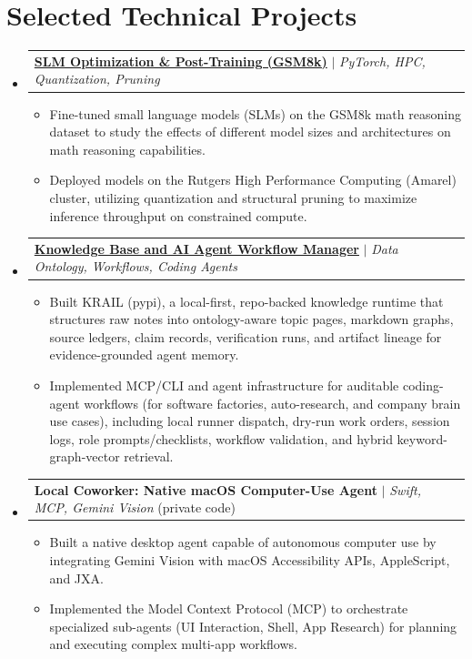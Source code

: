 \documentclass[letterpaper,11pt]{article}
\makeatletter
\newcommand{\resumeItem}[1]{
  \item\small{
    {#1 \vspace{-2pt}}
  }
}
\newcommand{\resumeProjectHeading}[2]{
    \item
    \begin{tabular*}{0.97\textwidth}{l@{\extracolsep{\fill}}r}
      \small#1 & #2 \\
    \end{tabular*}\vspace{-7pt}
}
\newcommand{\resumeSubHeadingListStart}{\begin{itemize}[leftmargin=0.15in, label={}]}
\newcommand{\resumeSubHeadingListEnd}{\end{itemize}}
\newcommand{\resumeItemListStart}{\begin{itemize}}
\newcommand{\resumeItemListEnd}{\end{itemize}\vspace{-5pt}}
\makeatother
\begin{document}
\section{Selected Technical Projects}
    \resumeSubHeadingListStart
      \resumeProjectHeading
          {\href{https://github.com/AkeBoss-tech/llm-research}{\textbf{SLM Optimization \& Post-Training (GSM8k)}} $|$ \emph{PyTorch, HPC, Quantization, Pruning}}{}
          \resumeItemListStart
            \resumeItem{Fine-tuned small language models (SLMs) on the GSM8k math reasoning dataset to study the effects of different model sizes and architectures on math reasoning capabilities.}
            \resumeItem{Deployed models on the Rutgers High Performance Computing (Amarel) cluster, utilizing quantization and structural pruning to maximize inference throughput on constrained compute.}
          \resumeItemListEnd

      \resumeProjectHeading
          {\href{https://github.com/AkeBoss-tech/knowledge}{\textbf{Knowledge Base and AI Agent Workflow Manager}} $|$ \emph{Data Ontology, Workflows, Coding Agents} }{}
          \resumeItemListStart
            \resumeItem{Built KRAIL (pypi), a local-first, repo-backed knowledge runtime that structures raw notes into ontology-aware topic pages, markdown graphs, source ledgers, claim records, verification runs, and artifact lineage for evidence-grounded agent memory.}
            \resumeItem{Implemented MCP/CLI and agent infrastructure for auditable coding-agent workflows (for software factories, auto-research, and company brain use cases), including local runner dispatch, dry-run work orders, session logs, role prompts/checklists, workflow validation, and hybrid keyword-graph-vector retrieval.}
          \resumeItemListEnd

      \resumeProjectHeading
          {\textbf{Local Coworker: Native macOS Computer-Use Agent} $|$ \emph{Swift, MCP, Gemini Vision} (private code)}{}
          \resumeItemListStart
            \resumeItem{Built a native desktop agent capable of autonomous computer use by integrating Gemini Vision with macOS Accessibility APIs, AppleScript, and JXA.}
            \resumeItem{Implemented the Model Context Protocol (MCP) to orchestrate specialized sub-agents (UI Interaction, Shell, App Research) for planning and executing complex multi-app workflows.}
          \resumeItemListEnd

    \resumeSubHeadingListEnd
\end{document}
